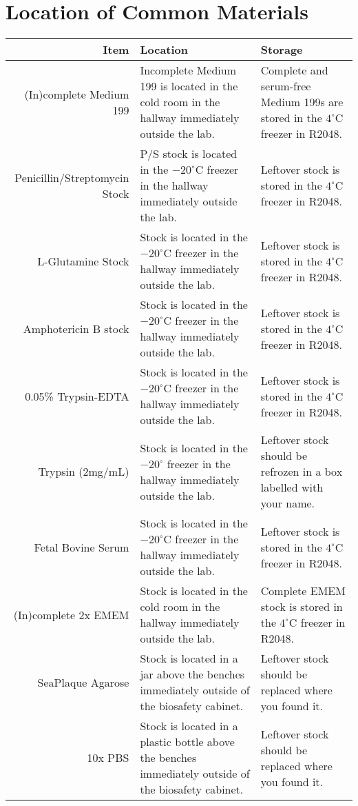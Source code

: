
\section{Location of Common Materials}

\begin{tabular*}{\textwidth}{r | p{2in} p{2in}}
\hline
Item & Location & Storage \\
\hline
(In)complete Medium 199 & Incomplete Medium 199 is located in the cold room in the hallway immediately outside the lab. & Complete and serum-free Medium 199s are stored in the $4^{\circ}$C freezer in R2048.\\
Penicillin/Streptomycin Stock & P/S stock is located in the $-20^{\circ}$C freezer in the hallway immediately outside the lab. & Leftover stock is stored in the $4^{\circ}$C freezer in R2048.\\
L-Glutamine Stock & Stock is located in the $-20^{\circ}$C freezer in the hallway immediately outside the lab. & Leftover stock is stored in the $4^{\circ}$C freezer in R2048.\\
Amphotericin B stock & Stock is located in the $-20^{\circ}$C freezer in the hallway immediately outside the lab. & Leftover stock is stored in the $4^{\circ}$C freezer in R2048.\\
0.05\% Trypsin-EDTA & Stock is located in the $-20^{\circ}$C freezer in the hallway immediately outside the lab. & Leftover stock is stored in the $4^{\circ}$C freezer in R2048.\\
Trypsin ($2$mg/mL) & Stock is located in the $-20^{\circ}$ freezer in the hallway immediately outside the lab. & Leftover stock should be refrozen in a box labelled with your name.\\
Fetal Bovine Serum & Stock is located in the $-20^{\circ}$C freezer in the hallway immediately outside the lab. & Leftover stock is stored in the $4^{\circ}$C freezer in R2048.\\
(In)complete 2x EMEM & Stock is located in the cold room in the hallway immediately outside the lab. & Complete EMEM stock is stored in the $4^{\circ}$C freezer in R2048.\\
SeaPlaque Agarose & Stock is located in a jar above the benches immediately outside of the biosafety cabinet. & Leftover stock should be replaced where you found it.\\
10x PBS & Stock is located in a plastic bottle above the benches immediately outside of the biosafety cabinet. & Leftover stock should be replaced where you found it. \\

\end{tabular*}

